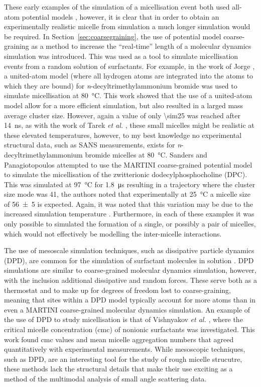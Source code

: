 These early examples of the simulation of a micellisation event both used all-atom potential models \cite{tarek_molecular_1998,maillet_large_1999}, however, it is clear that in order to obtain an experimentally realistic micelle from simulation a much longer simulation would be required.
In Section~\ref{sec:coarsegraining}, the use of potential model coarse-graining as a method to increase the ``real-time'' length of a molecular dynamics simulation was introduced.
This was used as a tool to simulate micellisation events from a random solution of surfactants.
For example, in the work of Jorge \cite{jorge_molecular_2008}, a united-atom model (where all hydrogen atoms are integrated into the atoms to which they are bound) for \emph{n}-decyltrimethylammonium bromide was used to simulate micellisation at \SI{80}{\celsius}.
This work showed that the use of a united-atom model allow for a more efficient simulation, but also resulted in a larged mass average cluster size.
However, again a value of only \num{\sim25} was reached after \SI{14}{\nano\second}, as with the work of Tarek \emph{et al.} \cite{tarek_molecular_1998}, these small micelles might be realistic at these elevated temperatures, however, to my best knowledge no experimental structural data, such as SANS measurements, exists for \emph{n}-decyltrimethylammonium bromide micelles at \SI{80}{\celsius}.
Sanders and Panagiotopoulos attempted to use the MARTINI coarse-grained potential model to simulate the micellisation of the zwitterionic dodecylphosphocholine (DPC).
This was simulated at \SI{97}{\celsius} for \SI{1.8}{\micro\second} resulting in a trajectory where the cluster size mode was 41, the authors noted that experimentally at \SI{25}{\celsius} a micelle size of \num{56\pm5} is expected.
Again, it was noted that this variation may be due to the increased simulation temperature \cite{malliaris_temperature_1985,kamenka_aqueous_1995}.
Furthermore, in each of these examples it was only possible to simulated the formation of a single, or possibly a pair of micelles, which would not effectively be modelling the inter-micelle interactions.

The use of mesoscale simulation techniques, such as dissipative particle dynamics (DPD), are common for the simulation of surfactant molecules in solution \cite{shelley_computer_2000}.
DPD simulations are similar to coarse-grained molecular dynamics simulation, however, with the inclusion additional dissipative and random forces.
These serve both as a thermostat and to make up for degrees of freedom lost to coarse-graining, meaning that sites within a DPD model typically account for more atoms than in even a MARTINI coarse-grained molecular dynamics simulation.
An example of the use of DPD to study micellisation is that of Vishnyakov \emph{et al.} \cite{vishnyakov_prediction_2013}, where the critical micelle concentration (cmc) of nonionic surfactants was investigated.
This work found cmc values and mean micelle aggregation numbers that agreed quantitatively with experimental measurements.
While mesoscopic techniques, such as DPD, are an interesting tool for the study of rough micelle strucutre, these methods lack the structural details that make their use exciting as a method of the multimodal analysis of small angle scattering data.

